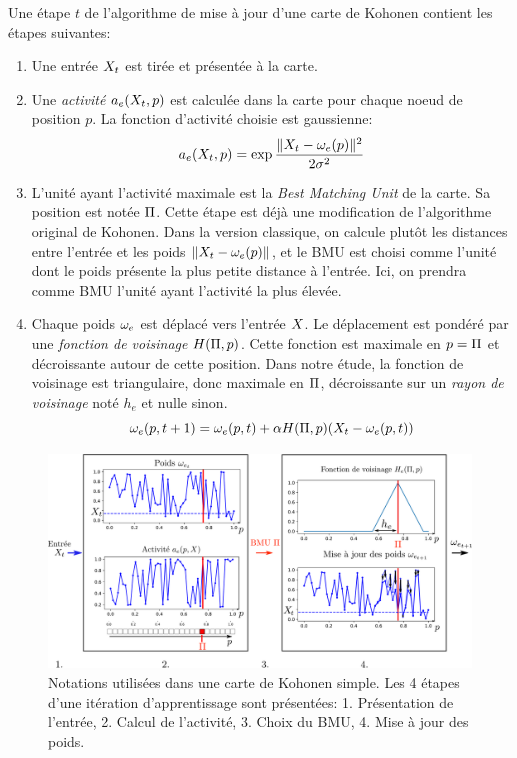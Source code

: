 Une étape $t$ de l'algorithme de mise à jour d'une carte de Kohonen contient les étapes suivantes:
\begin{enumerate}
\item\label{enum:inp} Une entrée $X_t$ est tirée et présentée à la carte.
\item\label{enum:act} Une \emph{activité} $a_e(X_t,p)$ est calculée dans la carte pour chaque noeud de position $p$. La fonction d'activité choisie est gaussienne:
\begin{equation}\label{eq:act1som}
a_e(X_t,p) = \exp{\frac{\lVert X_t-\omega_{e}(p) \rVert ^2}{2\sigma^2}}
\end{equation}
\item\label{enum:bmu} L'unité ayant l'activité maximale est la \emph{Best Matching Unit} de la carte. Sa position est notée $\Pi$. Cette étape est déjà une modification de l'algorithme original de Kohonen.
Dans la version classique, on calcule plutôt les distances entre l'entrée et les poids $\lVert X_t - \omega_e(p) \rVert$, et le BMU est choisi comme l'unité dont le poids présente la plus petite distance à l'entrée. 
Ici, on prendra comme BMU l'unité ayant l'activité la plus élevée.
\item Chaque poids $\omega_e$ est déplacé vers l'entrée $X$. Le déplacement est pondéré par une \emph{fonction de voisinage} $H(\Pi,p)$. Cette fonction est maximale en $p = \Pi$ et décroissante autour de cette position. Dans notre étude, la fonction de voisinage est triangulaire, donc maximale en $\Pi$, décroissante sur un \emph{rayon de voisinage} noté $h_e$ et nulle sinon.
\begin{equation}
\omega_e(p,t+1) = \omega_e(p,t) + \alpha H(\Pi,p)(X_t - \omega_e(p,t))
\label{eq:update}
\end{equation}
\end{enumerate}


\begin{figure}
\centering
\includegraphics[width=\textwidth]{one_map_one_layer2.pdf}
\caption{Notations utilisées dans une carte de Kohonen simple. Les 4 étapes d'une itération d'apprentissage sont présentées: 1. Présentation de l'entrée, 2. Calcul de l'activité, 3. Choix du BMU, 4. Mise à jour des poids.}
\label{fig:one_map_not}
\end{figure}


